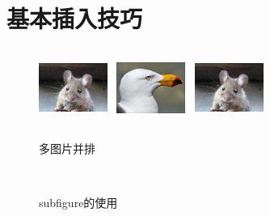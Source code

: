 \documentclass[fancyhdr,adobefonts,oneside,hyperref,openany,a4paper,UTF8]{ctexbook}
\begin{document}
\section{基本插入技巧}


\begin{figure}[htp]
  \centering
    \includegraphics[width=0.2\textwidth,height=2.5cm]{img/mouse}~
    \includegraphics[width=0.2\textwidth,height=2.5cm]{img/gull}~
    \includegraphics[width=0.2\textwidth,height=2.5cm]{img/mouse}
    \caption{多图片并排}
    \label{fig:tiger}
\end{figure}

\begin{figure}[htp]
    \centering
    \\
    \caption{subfigure的使用}
    \label{fig:sample_subfigures}
\end{figure}
\end{document}
